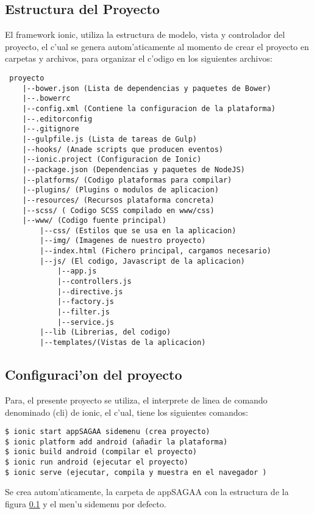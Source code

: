 \subsection{Estructura del Proyecto}
\label{EstructuraIonic}
El framework ionic, utiliza la estructura de modelo, vista y controlador del proyecto, el c'ual se genera autom'aticamente al momento de crear el proyecto en carpetas y archivos, para organizar el c'odigo en los siguientes archivos:

\begin{verbatim}
 proyecto
    |--bower.json (Lista de dependencias y paquetes de Bower)
    |--.bowerrc
    |--config.xml (Contiene la configuracion de la plataforma)
    |--.editorconfig
    |--.gitignore
    |--gulpfile.js (Lista de tareas de Gulp)
    |--hooks/ (Anade scripts que producen eventos)
    |--ionic.project (Configuracion de Ionic)
    |--package.json (Dependencias y paquetes de NodeJS)
    |--platforms/ (Codigo plataformas para compilar)
    |--plugins/ (Plugins o modulos de aplicacion)
    |--resources/ (Recursos plataforma concreta)
    |--scss/ ( Codigo SCSS compilado en www/css)
    |--www/ (Codigo fuente principal)
        |--css/ (Estilos que se usa en la aplicacion)
        |--img/ (Imagenes de nuestro proyecto)
        |--index.html (Fichero principal, cargamos necesario)
        |--js/ (El codigo, Javascript de la aplicacion)
            |--app.js 
            |--controllers.js
            |--directive.js
            |--factory.js
            |--filter.js
            |--service.js
        |--lib (Librerias, del codigo)
        |--templates/(Vistas de la aplicacion)
\end{verbatim}

\subsection{Configuraci'on del proyecto}

Para, el presente proyecto se utiliza, el interprete de linea de comando denominado (cli) de ionic, el c'ual, tiene los siguientes comandos:

\begin{verbatim}
$ ionic start appSAGAA sidemenu (crea proyecto)
$ ionic platform add android (añadir la plataforma)
$ ionic build android (compilar el proyecto)
$ ionic run android (ejecutar el proyecto)
$ ionic serve (ejecutar, compila y muestra en el navegador )
\end{verbatim}

Se crea autom'aticamente, la carpeta de appSAGAA con  la estructura  de la figura \ref{EstructuraIonic} y el men'u sidemenu por defecto.

